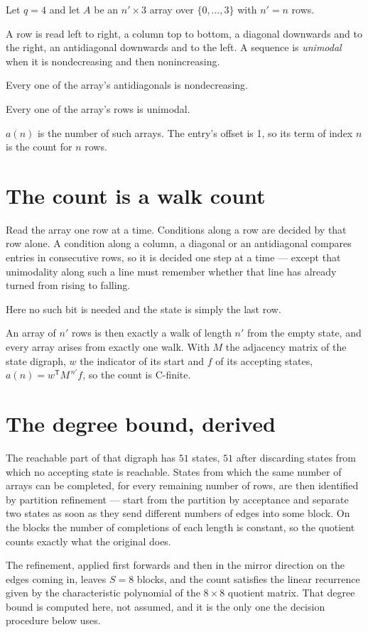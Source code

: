 \documentclass[11pt]{article}
\theoremstyle{definition}
\begin{document}
Let $q = 4$ and let $A$ be an $n' \times 3$ array over $\{0,\dots,3\}$ with $n' = n$ rows.

A row is read left to right, a column top to bottom, a diagonal downwards and to the right, an antidiagonal downwards and to the left. A sequence is {\itshape unimodal} when it is nondecreasing and then nonincreasing.

Every one of the array's antidiagonals is nondecreasing.

Every one of the array's rows is unimodal.

$a(n)$ is the number of such arrays. The entry's offset is 1, so its term of index $n$ is the count for $n$ rows.

\section{The count is a walk count}

Read the array one row at a time. Conditions along a row are decided by that row alone. A condition along a column, a diagonal or an antidiagonal compares entries in consecutive rows, so it is decided one step at a time --- except that unimodality along such a line must remember whether that line has already turned from rising to falling.

Here no such bit is needed and the state is simply the last row.

An array of $n'$ rows is then exactly a walk of length $n'$ from the empty state, and every array arises from exactly one walk. With $M$ the adjacency matrix of the state digraph, $w$ the indicator of its start and $f$ of its accepting states, $a(n) = w^{\mathsf T}M^{\,n'}f$, so the count is C-finite.

\section{The degree bound, derived}

The reachable part of that digraph has $51$ states, $51$ after discarding states from which no accepting state is reachable. States from which the same number of arrays can be completed, for every remaining number of rows, are then identified by partition refinement --- start from the partition by acceptance and separate two states as soon as they send different numbers of edges into some block. On the blocks the number of completions of each length is constant, so the quotient counts exactly what the original does.

The refinement, applied first forwards and then in the mirror direction on the edges coming in, leaves $S = 8$ blocks, and the count satisfies the linear recurrence given by the characteristic polynomial of the $8 \times 8$ quotient matrix. That degree bound is computed here, not assumed, and it is the only one the decision procedure below uses.
\end{document}
